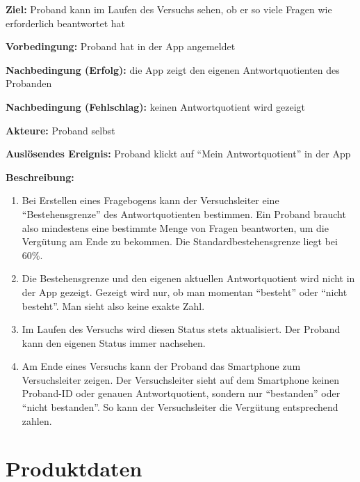 \documentclass[a4paper]{scrreprt}
\begin{document}
\begin{itemize}
            \par \textbf{Ziel: }Proband kann im Laufen des Versuchs sehen, ob er so viele Fragen wie erforderlich beantwortet hat
            \par \textbf{Vorbedingung: }Proband hat in der App angemeldet
            \par \textbf{Nachbedingung (Erfolg): }die App zeigt den eigenen Antwortquotienten des Probanden
            \par \textbf{Nachbedingung (Fehlschlag): }keinen Antwortquotient wird gezeigt
            \par \textbf{Akteure: }Proband selbst
            \par \textbf{Auslösendes Ereignis: }Proband klickt auf “Mein Antwortquotient” in der App
            \par \textbf{Beschreibung: }
                \begin{enumerate}
                    \item Bei Erstellen eines Fragebogens kann der Versuchsleiter eine “Bestehensgrenze” des Antwortquotienten bestimmen. Ein Proband braucht also mindestens eine bestimmte Menge von Fragen beantworten, um die Vergütung am Ende zu bekommen. Die Standardbestehensgrenze liegt bei 60\%.
                    \item Die Bestehensgrenze und den eigenen aktuellen Antwortquotient wird nicht in der App gezeigt. Gezeigt wird nur, ob man momentan “besteht” oder “nicht besteht”. Man sieht also keine exakte Zahl.
                    \item Im Laufen des Versuchs wird diesen Status stets aktualisiert. Der Proband kann den eigenen Status immer nachsehen.
                    \item Am Ende eines Versuchs kann der Proband das Smartphone zum Versuchsleiter zeigen. Der Versuchsleiter sieht auf dem Smartphone keinen Proband-ID oder genauen Antwortquotient, sondern nur “bestanden” oder “nicht bestanden”. So kann der Versuchsleiter die Vergütung entsprechend zahlen.
                \end{enumerate}

        \end{itemize}

    \chapter{Produktdaten}
\end{document}
